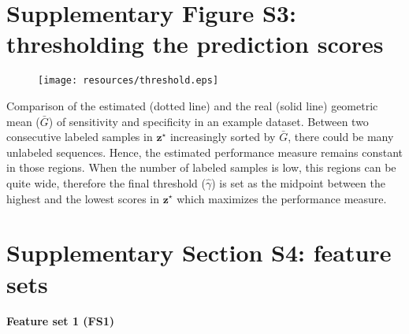 \documentclass[]{scrartcl}
\begin{document}
\newpage
\section*{Supplementary Figure S3: thresholding the prediction scores}
	\vspace{4pt}
	\begin{figure}[h!]
	\centering
		\texttt{[image: resources/threshold.eps]}
		\label{fig:threshold}
	\end{figure}
	\vspace{4pt}

	Comparison of the estimated (dotted line) and the real (solid line) geometric mean ($\bar{G}$) of sensitivity and specificity in an example dataset. Between two consecutive labeled samples in $\mathbf{z}^\star$ increasingly sorted by $\bar{G}$, there could be many unlabeled sequences. Hence, the estimated performance measure remains constant in those regions. When the number of labeled samples is low, this regions can be quite wide, therefore the final threshold ($\hat{\gamma}$) is set as the midpoint between the highest and the lowest scores in $\mathbf{z}^\star$ which maximizes the performance measure.

\newpage
\section*{Supplementary Section S4: feature sets}

\vspace{10pt}
{\Large \textbf{Feature set 1 (FS1)}}
\vspace{2pt}
\end{document}
